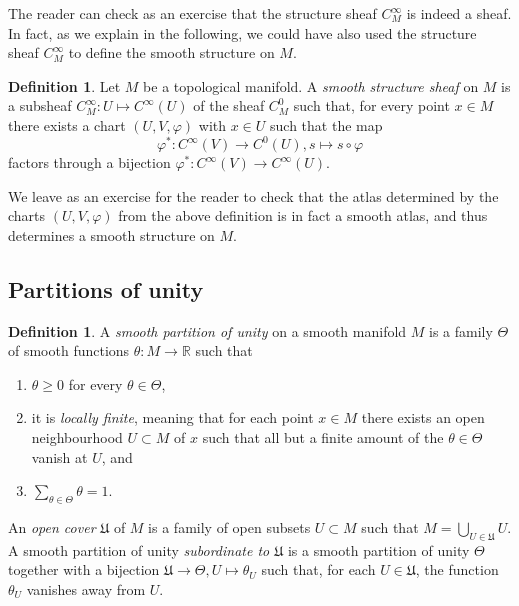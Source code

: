\documentclass[11pt,a4paper]{book}
\theoremstyle{remark} \newtheorem{rmk}[thm]{Remark}
\theoremstyle{definition} \newtheorem{defn}[thm]{Definition}
\theoremstyle{definition} \newtheorem{ex}[thm]{Example}
\theoremstyle{definition} \newtheorem{ej}[thm]{Exercise}
\begin{document}
The reader can check as an exercise that the structure sheaf $C^\infty_M$ is indeed a sheaf. In fact, as we explain in the following, we could have also used the structure sheaf $C^\infty_M$ to define the smooth structure on $M$.

\begin{defn}
  Let $M$ be a topological manifold. A \emph{smooth structure sheaf} on $M$ is a subsheaf $C^\infty_M:U\mapsto C^\infty(U)$ of the sheaf $C^0_M$ such that, for every point $x\in M$ there exists a chart $(U,V,\varphi)$ with $x\in U$ such that the map
  \begin{equation*}
\varphi^*: C^\infty(V) \rightarrow C^0(U), s \mapsto s\circ \varphi
  \end{equation*}
  factors through a bijection $\varphi^*: C^\infty(V)\rightarrow C^\infty(U)$.
\end{defn}

We leave as an exercise for the reader to check that the atlas determined by the charts $(U,V,\varphi)$ from the above definition is in fact a smooth atlas, and thus determines a smooth structure on $M$.

\subsection{Partitions of unity}
\begin{defn}
  A \emph{smooth partition of unity} on a smooth manifold $M$ is a family $\Theta$ of smooth functions $\theta:M\rightarrow \mathbb{R}$ such that
  \begin{enumerate}
    \item $\theta \geq 0$ for every $\theta \in \Theta$,
    \item it is \emph{locally finite}, meaning that for each point $x\in M$ there exists an open neighbourhood $U\subset M$ of $x$ such that all but a finite amount of the $\theta \in \Theta$ vanish at $U$, and
          \item $\sum_{\theta \in \Theta} \theta = 1$.
  \end{enumerate}

  An \emph{open cover} $\mathfrak{U}$ of $M$ is a family of open subsets $U\subset M$ such that $M=\bigcup_{U\in \mathfrak{U}} U$. A smooth partition of unity \emph{subordinate to $\mathfrak{U}$} is a smooth partition of unity $\Theta$ together with a bijection $\mathfrak{U}\rightarrow \Theta, U\mapsto \theta_U$ such that, for each $U\in \mathfrak{U}$, the function $\theta_U$ vanishes away from $U$.
\end{defn}
\end{document}
